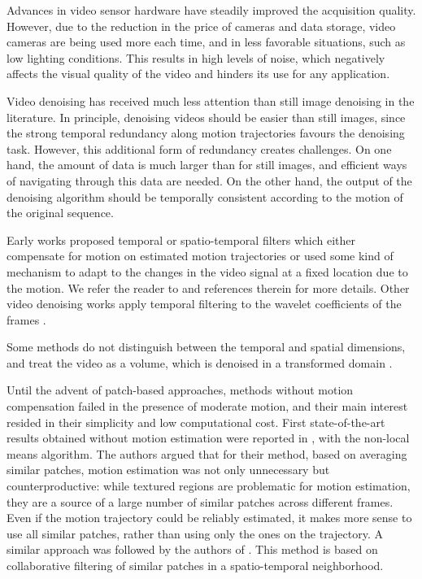 \documentclass[10pt, journal, twocolumn, final, a4paper]{IEEEtran}
\newcommand{\pcomment}[1]{}
\begin{document}
Advances in video sensor hardware have steadily improved the acquisition
quality. However, due to the reduction in the price of cameras
and data storage, video cameras are being used more each time, and in less
favorable situations, such as low lighting conditions. This results in high 
levels of noise, which negatively affects the visual quality of the video and
hinders its use for any application. 
\pcomment{It would be nice to have some reference for these claims about
sensors, camera prices, etc.}

Video denoising has received much less attention than still image denoising in
the literature.  In principle, denoising videos should be easier than still
images, since the strong temporal redundancy along motion trajectories favours
the denoising task. However, this additional form of redundancy creates
challenges.  On one hand, the amount of data is much larger than for still
images, and efficient ways of navigating through this data are needed. On the
other hand, the output of the denoising algorithm should be temporally
consistent according to the motion of the original sequence.

Early works proposed temporal or spatio-temporal filters which either compensate
for motion on estimated motion trajectories or used some kind of mechanism to
adapt to the changes in the video signal at a fixed location due to the motion.
We refer the reader to \cite{Brailean1995a} and references therein for more details.
Other video denoising works apply temporal filtering to the wavelet coefficients 
of the frames \cite{Jin2006,Zlokolica2006a}. 

Some methods do not distinguish between the temporal and spatial dimensions,
and treat the video as a volume, which is denoised in a transformed domain
\cite{Rajpoot2003,Wilson2004,Selesnick2003}. 
\pcomment{TODO: Read these references. Even if they consider a 3D transform, I think
they DO distinguish between space and time}

Until the advent of patch-based approaches, methods without motion compensation
failed in the presence of moderate motion, and their main interest resided
in their simplicity and low computational cost. First state-of-the-art results
obtained without motion estimation were reported in \cite{Buades2005v}, with the
non-local means algorithm. The authors argued that for their method, based on
averaging similar patches, motion estimation was not only unnecessary but
counterproductive: while textured regions are problematic for motion
estimation, they are a source of a large number of similar patches across
different frames. Even if the motion trajectory could be reliably estimated, it
makes more sense to use all similar patches, rather than using only the ones on the
trajectory.
%
A similar approach was followed by the authors of \cite{Dabov2007v}. This method is based
on collaborative filtering of similar patches in a
spatio-temporal neighborhood. 
\end{document}
